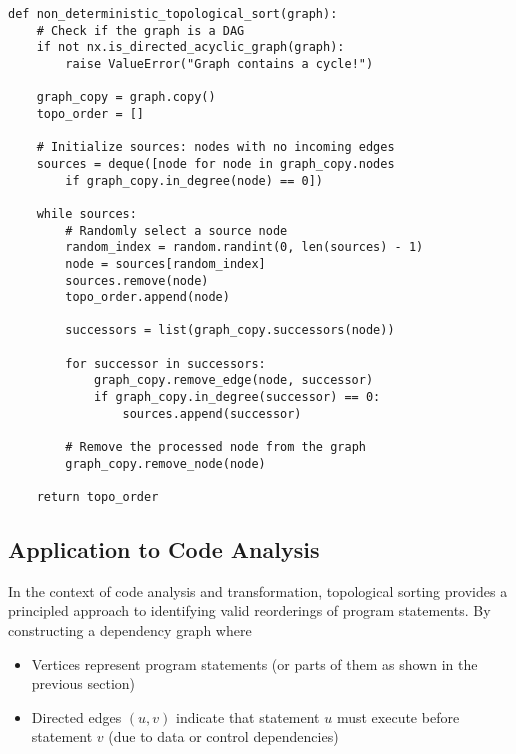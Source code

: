 \documentclass[%
thesis=student,%
coverpage=false,%
titlepage=false,%
headmarks=true, %
english,%
font=libertine, %
math=newpxtx, %
BCOR=5mm,%
coverBCOR=11mm%
]{tum-templates/book/tumbook}
\begin{document}
\begin{lstlisting}[style=pythonstyle, caption={Non-deterministic topological sorting algorithm implementation using Kahn's algorithm. The algorithm maintains a queue of source nodes (nodes with no incoming edges) and randomly selects which source to process next, enabling generation of different valid orderings of the same directed acyclic graph.}]
def non_deterministic_topological_sort(graph):
    # Check if the graph is a DAG
    if not nx.is_directed_acyclic_graph(graph):
        raise ValueError("Graph contains a cycle!")

    graph_copy = graph.copy()
    topo_order = []

    # Initialize sources: nodes with no incoming edges
    sources = deque([node for node in graph_copy.nodes
        if graph_copy.in_degree(node) == 0])

    while sources:
        # Randomly select a source node
        random_index = random.randint(0, len(sources) - 1)
        node = sources[random_index]
        sources.remove(node)
        topo_order.append(node)

        successors = list(graph_copy.successors(node))

        for successor in successors:
            graph_copy.remove_edge(node, successor)
            if graph_copy.in_degree(successor) == 0:
                sources.append(successor)

        # Remove the processed node from the graph
        graph_copy.remove_node(node)

    return topo_order
\end{lstlisting}



\subsection{Application to Code Analysis}

In the context of code analysis and transformation, topological sorting provides a principled approach to identifying valid reorderings of program statements. By constructing a dependency graph where

\begin{itemize}
    \item Vertices represent program statements (or parts of them as shown in the previous section)
    \item Directed edges $(u, v)$ indicate that statement $u$ must execute before statement $v$ (due to data or control dependencies)
\end{itemize}
\end{document}
